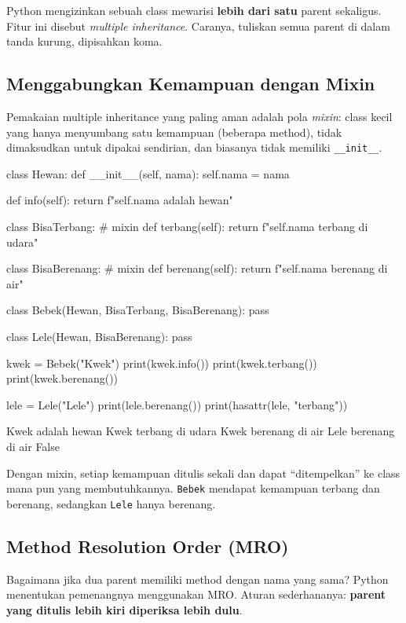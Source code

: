 Python mengizinkan sebuah class mewarisi \textbf{lebih dari satu} parent sekaligus. Fitur ini disebut \emph{multiple inheritance}. Caranya, tuliskan semua parent di dalam tanda kurung, dipisahkan koma.

\subsection{Menggabungkan Kemampuan dengan Mixin}

Pemakaian multiple inheritance yang paling aman adalah pola \emph{mixin}: class kecil yang hanya menyumbang satu kemampuan (beberapa method), tidak dimaksudkan untuk dipakai sendirian, dan biasanya tidak memiliki \texttt{\_\_init\_\_}.

\begin{kode}
class Hewan:
    def __init__(self, nama):
        self.nama = nama

    def info(self):
        return f"{self.nama} adalah hewan"

class BisaTerbang:                       # mixin
    def terbang(self):
        return f"{self.nama} terbang di udara"

class BisaBerenang:                      # mixin
    def berenang(self):
        return f"{self.nama} berenang di air"

class Bebek(Hewan, BisaTerbang, BisaBerenang):
    pass

class Lele(Hewan, BisaBerenang):
    pass

kwek = Bebek("Kwek")
print(kwek.info())
print(kwek.terbang())
print(kwek.berenang())

lele = Lele("Lele")
print(lele.berenang())
print(hasattr(lele, "terbang"))
\end{kode}

\begin{keluaran}
Kwek adalah hewan
Kwek terbang di udara
Kwek berenang di air
Lele berenang di air
False
\end{keluaran}

Dengan mixin, setiap kemampuan ditulis sekali dan dapat ``ditempelkan'' ke class mana pun yang membutuhkannya. \texttt{Bebek} mendapat kemampuan terbang dan berenang, sedangkan \texttt{Lele} hanya berenang.

\subsection{Method Resolution Order (MRO)}

Bagaimana jika dua parent memiliki method dengan nama yang sama? Python menentukan pemenangnya menggunakan MRO. Aturan sederhananya: \textbf{parent yang ditulis lebih kiri diperiksa lebih dulu}.

